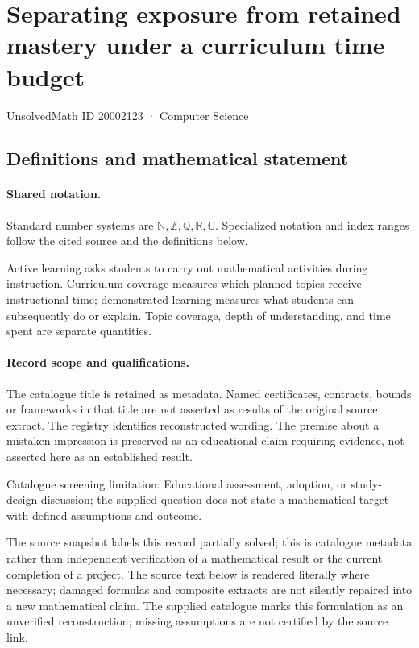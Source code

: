 \documentclass[11pt]{article}
\begin{document}
\setcounter{section}{20002122}
\section{Separating exposure from retained mastery under a curriculum time budget}\label{20002123}
{\small\sffamily UnsolvedMath ID 20002123 · Computer Science}
\subsection{Definitions and mathematical statement}

\paragraph{Shared notation.}Standard number systems are $\mathbb N,\mathbb Z,\mathbb Q,\mathbb R,\mathbb C$. Specialized notation and index ranges follow the cited source and the definitions below.


Active learning asks students to carry out mathematical activities during instruction. Curriculum coverage measures which planned topics receive instructional time; demonstrated learning measures what students can subsequently do or explain. Topic coverage, depth of understanding, and time spent are separate quantities.
\paragraph{Record scope and qualifications.}
The catalogue title is retained as metadata. Named certificates, contracts, bounds or frameworks in that title are not asserted as results of the original source extract.
The registry identifies reconstructed wording. The premise about a mistaken impression is preserved as an educational claim requiring evidence, not asserted here as an established result.

Catalogue screening limitation: Educational assessment, adoption, or study-design discussion; the supplied question does not state a mathematical target with defined assumptions and outcome.

The source snapshot labels this record partially solved; this is catalogue metadata rather than independent verification of a mathematical result or the current completion of a project.
The source text below is rendered literally where necessary; damaged formulas and composite extracts are not silently repaired into a new mathematical claim.
The supplied catalogue marks this formulation as an unverified reconstruction; missing assumptions are not certified by the source link.
\end{document}
